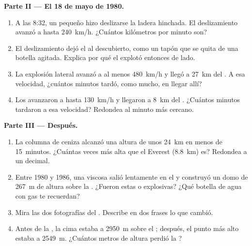 \begin{problem}
\medskip
\noindent\textbf{Parte II --- El 18 de mayo de 1980.}\par\nopagebreak
\begin{enumerate}[resume, beginpenalty=10000]
  \item A las 8:32, un pequeño  hizo deslizarse la ladera
        hinchada. El deslizamiento avanzó a hasta \qty{240}{km/h}. ¿Cuántos
        kilómetros por minuto son?
  \item El deslizamiento dejó el  al descubierto, como un tapón que se
        quita de una botella agitada. Explica por qué el  explotó
        entonces de lado.
  \item La explosión lateral avanzó a al menos \qty{480}{km/h} y llegó a
        \qty{27}{km} del . A esa velocidad, ¿cuántos minutos tardó,
        como mucho, en llegar allí?
  \item Los  avanzaron a hasta \qty{130}{km/h} y
        llegaron a \qty{8}{km} del . ¿Cuántos minutos tardaron a esa
        velocidad? Redondea al minuto más cercano.
\end{enumerate}

\medskip
\noindent\textbf{Parte III --- Después.}\par\nopagebreak
\begin{enumerate}[resume, beginpenalty=10000]
  \item La columna de ceniza alcanzó una altura de unos \qty{24}{km} en
        menos de 15~minutos. ¿Cuántas veces más alta que el Everest
        (\qty{8.8}{km}) es? Redondea a un decimal.
  \item Entre 1980 y 1986, una  viscosa salió lentamente en el  y
        construyó un domo de \qty{267}{m} de altura sobre la . ¿Fueron
        estas  o explosivas? ¿Qué botella de agua con gas
        te recuerdan?
  \item Mira las dos fotografías del . Describe en dos frases lo que
        cambió.
  \item Antes de la , la cima estaba a \qty{2950}{m} sobre el ; después, el punto más alto estaba a \qty{2549}{m}. ¿Cuántos
        metros de altura perdió la ?
\end{enumerate}
\end{problem}
